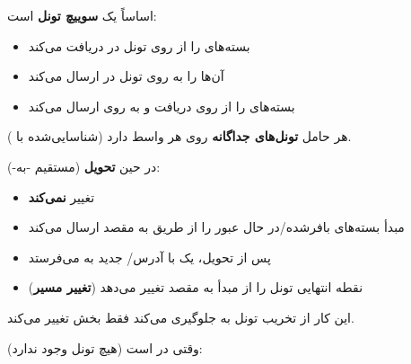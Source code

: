 

\CNchained{}

 اساساً یک \textbf{سوییچ تونل } است:

\begin{itemize}
\tightlist
\item
  بسته‌های  را از  روی تونل  در  دریافت می‌کند
\item
  آن‌ها را به  روی تونل  در  ارسال می‌کند
\item
  بسته‌های  را از  روی  دریافت و به  روی  ارسال می‌کند
\end{itemize}

هر حامل \textbf{تونل‌های  جداگانه} روی هر واسط دارد (شناسایی‌شده با ).


در حین \textbf{تحویل } (مستقیم -به-):

\begin{itemize}
\tightlist
\item
   تغییر \textbf{نمی‌کند}
\item
   مبدأ بسته‌های بافر‌شده/\allowbreak{}در حال عبور را از طریق  به  مقصد ارسال می‌کند
\item
  پس از تحویل،  یک  با آدرس/\allowbreak{} جدید  به  می‌فرستد
\item
   نقطه انتهایی تونل  را از  مبدأ به  مقصد تغییر می‌دهد (\textbf{تغییر مسیر})
\end{itemize}

این کار از تخریب تونل  به  جلوگیری می‌کند  فقط بخش  تغییر می‌کند.


وقتی  در  است (هیچ تونل  وجود ندارد):

